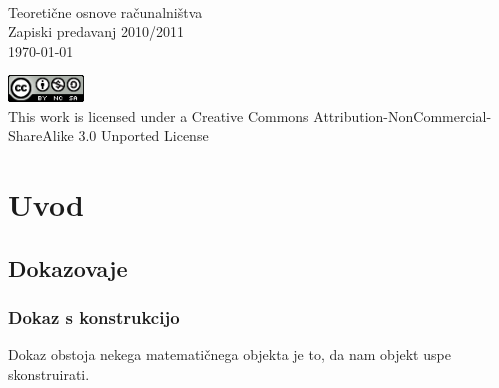 \documentclass[10pt,a4paper,oneside]{book}
\begin{document}
\begin{titlepage}
\begin{center}
\ \\[8cm]
{\huge Teoretične osnove računalništva}\\[1.5pt]
{\large Zapiski predavanj 2010/2011}\\[15pt]
{\large \today}
\vfill

\parbox{7.5cm}{
\begin{center}
\includegraphics[width=0.15\textwidth]{../CC}\\[5pt]

This work is licensed under a Creative Commons Attribution-NonCommercial-ShareAlike 3.0 Unported License
\end{center}
}
\end{center}
\end{titlepage}
\tableofcontents


\pagebreak
\chapter{Uvod}
\section{Dokazovaje}
\subsection{Dokaz s konstrukcijo}
Dokaz obstoja nekega matematičnega objekta je to, da nam objekt uspe skonstruirati.
\end{document}
